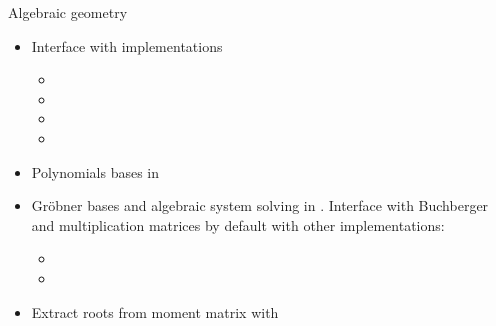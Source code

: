 \documentclass{beamer}
\begin{document}
\begin{frame}{Algebraic geometry}
    \begin{itemize}
        \item Interface  with implementations
            \begin{itemize}
                \item {}
                \item {}
                \item {}
                \item {}
            \end{itemize}
        \item Polynomials bases in 
        \item Gröbner bases and algebraic system solving in .
            Interface with Buchberger and multiplication matrices by default
            with other implementations:
            \begin{itemize}
                \item {}
                \item {}
            \end{itemize}
        \item Extract roots from moment matrix with 
    \end{itemize}
\end{frame}
\end{document}
